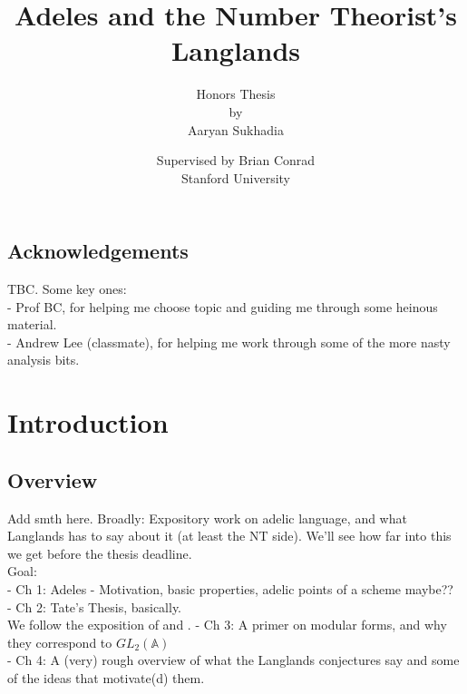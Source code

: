 \documentclass[11pt, x11names, openany]{book}
\renewcommand{\aa}{\mathbb{A}}
\begin{document}
\scshape

\title{\Huge Adeles and the Number Theorist's Langlands}

\author{\Large Honors Thesis \\ \Large by \\ \Large Aaryan Sukhadia}
\date{Supervised by Brian Conrad \\ Stanford University}

\onehalfspacing

\maketitle 

\upshape

\section*{Acknowledgements}

TBC. Some key ones:\\
- Prof BC, for helping me choose topic and guiding me through some heinous material.\\
- Andrew Lee (classmate), for helping me work through some of the more nasty analysis bits.


\tableofcontents

\chapter*{Introduction}

\section*{Overview}
\label{section: Overview}
 Add smth here. Broadly: Expository work on adelic language, and what Langlands has to say about it (at least the NT side). We'll see how far into this we get before the thesis deadline.\\

Goal:\\
 - Ch 1: Adeles - Motivation, basic properties, adelic points of a scheme maybe??\\
 - Ch 2: Tate's Thesis, basically.\\
 We follow the exposition of \cite{ramakrishnan1998fourier} and \cite{weil1974basic}.
 - Ch 3: A primer on modular forms, and why they correspond to $GL_2(\aa)$\\
 - Ch 4: A (very) rough overview of what the Langlands conjectures say and some of the ideas that motivate(d) them.
\end{document}
